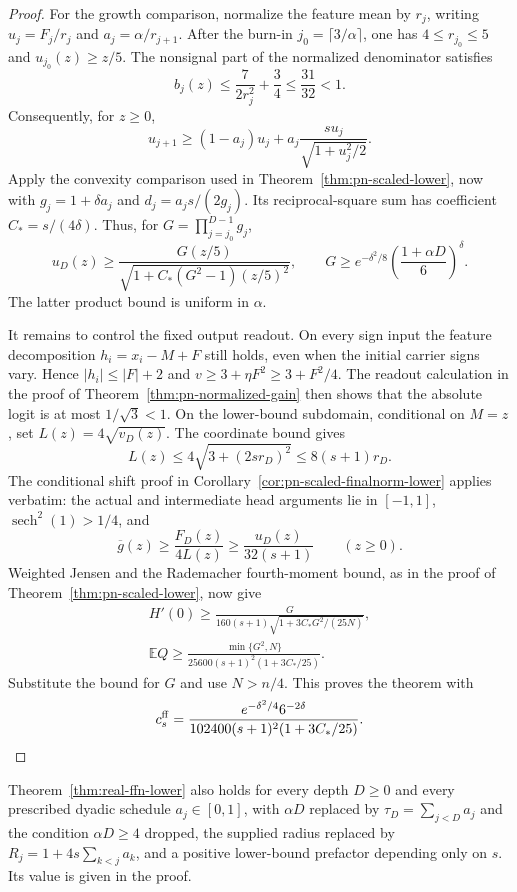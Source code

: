 \begin{proof}
For the growth comparison, normalize the feature mean by $r_j$,
writing $u_j=F_j/r_j$ and $a_j=\alpha/r_{j+1}$. After the burn-in
$j_0=\lceil3/\alpha\rceil$, one has $4\le r_{j_0}\le5$ and
$u_{j_0}(z)\ge z/5$. The nonsignal part of the normalized denominator
satisfies
\[
 b_j(z)\le\frac{7}{2r_j^2}+\frac34\le\frac{31}{32}<1.
\]
Consequently, for $z\ge0$,
\[
 u_{j+1}\ge(1-a_j)u_j+
          a_j\frac{s u_j}{\sqrt{1+u_j^2/2}}.
\]
Apply the convexity comparison used in
Theorem~\ref{thm:pn-scaled-lower}, now with
$g_j=1+\delta a_j$ and $d_j=a_js/(2g_j)$. Its reciprocal-square
sum has coefficient $C_*=s/(4\delta)$. Thus, for
$G=\prod_{j=j_0}^{D-1}g_j$,
\[
 u_D(z)\ge
 \frac{G(z/5)}{\sqrt{1+C_*(G^2-1)(z/5)^2}},\qquad
 G\ge e^{-\delta^2/8}\left(\frac{1+\alpha D}{6}\right)^\delta.
\]
The latter product bound is uniform in $\alpha$.

It remains to control the fixed output readout. On every sign input
the feature decomposition $h_i=x_i-M+F$ still holds, even when the
initial carrier signs vary. Hence $|h_i|\le |F|+2$ and
$v\ge3+\eta F^2\ge3+F^2/4$. The readout calculation in the proof of
Theorem~\ref{thm:pn-normalized-gain} then shows that the absolute logit
is at most $1/\sqrt3<1$.
On the lower-bound subdomain, conditional on $M=z$, set
$L(z)=4\sqrt{v_D(z)}$. The coordinate bound gives
\[
 L(z)\le4\sqrt{3+(2s r_D)^2}\le8(s+1)r_D.
\]
The conditional shift proof in
Corollary~\ref{cor:pn-scaled-finalnorm-lower} applies verbatim:
the actual and intermediate head arguments lie in $[-1,1]$,
$\operatorname{sech}^2(1)>1/4$, and
\[
 \overline g(z)\ge\frac{F_D(z)}{4L(z)}
 \ge\frac{u_D(z)}{32(s+1)}\qquad(z\ge0).
\]
Weighted Jensen and the Rademacher fourth-moment bound, as in the
proof of Theorem~\ref{thm:pn-scaled-lower}, now give
\begin{gather*}
 H'(0)\ge
 \frac{G}{160(s+1)\sqrt{1+3C_*G^2/(25N)}},\\
 \mathbb E Q\ge
 \frac{\min\{G^2,N\}}{25600(s+1)^2(1+3C_*/25)}.
\end{gather*}
Substitute the bound for $G$ and use $N>n/4$. This proves the theorem
with
\[
 c_s^{\rm ff}=\frac{e^{-\delta^2/4}6^{-2\delta}}
                     {102400(s+1)^2(1+3C_*/25)}.
\]
\end{proof}

\begin{corollary}
\label{cor:real-ffn-scheduled}
Theorem~\ref{thm:real-ffn-lower} also holds for every depth $D\ge0$
and every prescribed dyadic schedule $a_j\in[0,1]$, with $\alpha D$
replaced by $\tau_D=\sum_{j<D}a_j$ and the condition $\alpha D\ge4$
dropped, the supplied radius replaced by $R_j=1+4s\sum_{k<j}a_k$, and
a positive lower-bound prefactor depending only on $s$. Its value is
given in the proof.
\end{corollary}
